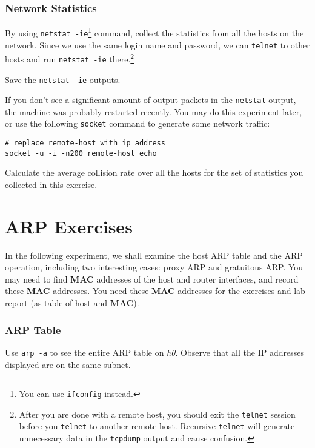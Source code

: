 \documentclass{../UTNetLab}
\begin{document}
\section{Network Statistics}
    By using \lstinline{netstat -ie}\footnote{You can use \lstinline{ifconfig} instead.} command, collect the statistics from all the hosts on the network.
    Since we use the same login name and password, we can \lstinline{telnet} to other hosts and run \lstinline{netstat -ie} there.\footnote{%
    After you are done with a remote host, you should exit the \lstinline{telnet} session before you \lstinline{telnet} to another remote host.
    Recursive \lstinline{telnet} will generate unnecessary data in the \lstinline{tcpdump} output and cause confusion.
    }

    Save the \lstinline{netstat -ie} outputs.

    If you don’t see a significant amount of output packets in the \lstinline{netstat} output, the machine was probably restarted recently.
    You may do this experiment later, or use the following \lstinline{socket} command to generate some network traffic:
    \begin{lstlisting}[emph={remote-host}]
# replace remote-host with ip address
socket -u -i -n200 remote-host echo
    \end{lstlisting}
    
    \begin{report}
    \item Calculate the average collision rate over all the hosts for the set of statistics you collected in this exercise.
    \end{report}

\part{ARP Exercises}
    In the following experiment, we shall examine the host ARP table and the ARP operation, including two interesting cases: proxy ARP and gratuitous ARP.
    You may need to find \textbf{MAC} addresses of the host and router interfaces, and record these \textbf{MAC} addresses.
    You need these \textbf{MAC} addresses for the exercises and lab report (as table of host and \textbf{MAC}).

\section{ARP Table}
    Use \lstinline{arp -a} to see the entire ARP table on \textit{h0}.
    Observe that all the IP addresses displayed are on the same subnet.
\end{document}
